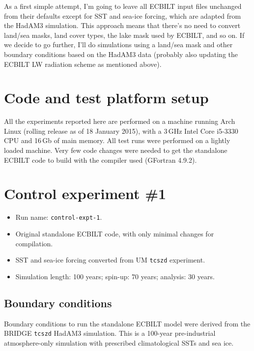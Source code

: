 \documentclass[a4paper,11pt,article]{article}
\begin{document}
As a first simple attempt, I'm going to leave all ECBILT input files
unchanged from their defaults except for SST and sea-ice forcing,
which are adapted from the HadAM3 simulation.  This approach means
that there's no need to convert land/sea masks, land cover types, the
lake mask used by ECBILT, and so on.  If we decide to go further, I'll
do simulations using a land/sea mask and other boundary conditions
based on the HadAM3 data (probably also updating the ECBILT LW
radiation scheme as mentioned above).


\section{Code and test platform setup}

All the experiments reported here are performed on a machine running
Arch Linux (rolling release as of 18 January 2015), with a 3\,GHz
Intel Core i5-3330 CPU and 16\,Gb of main memory.  All test runs were
performed on a lightly loaded machine.  Very few code changes were
needed to get the standalone ECBILT code to build with the compiler
used (GFortran 4.9.2).


\section{Control experiment \#1}

\begin{itemize}
  \item{Run name: \texttt{control-expt-1}.}
  \item{Original standalone ECBILT code, with only minimal changes for
    compilation.}
  \item{SST and sea-ice forcing converted from UM \texttt{tcszd}
    experiment.}
  \item{Simulation length: 100 years; spin-up: 70 years; analysis: 30
    years.}
\end{itemize}

\subsection{Boundary conditions}

Boundary conditions to run the standalone ECBILT model were derived
from the BRIDGE \texttt{tcszd} HadAM3 simulation.  This is a 100-year
pre-industrial atmosphere-only simulation with prescribed
climatological SSTs and sea ice.
\end{document}
